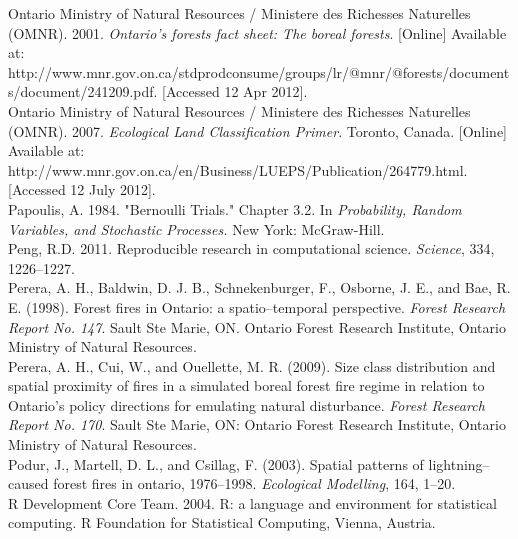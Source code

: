 \begin{spacing}{1.5}
\noindent Ontario Ministry of Natural Resources / Ministere des Richesses Naturelles (OMNR). 2001. \emph{Ontario's  forests  fact  sheet: The boreal forests}. [Online] Available at: http://www.mnr.gov.on.ca/stdprodconsume/groups/lr/@mnr/@forests/\linebreak documents/document/241209.pdf. [Accessed 12 Apr 2012].\\

\noindent Ontario Ministry of Natural Resources / Ministere des Richesses Naturelles (OMNR). 2007. \emph{Ecological Land Classification Primer}. Toronto, Canada. [Online] Available at: http://www.mnr.gov.on.ca/en/Business/LUEPS/Publication\linebreak /264779.html. [Accessed 12 July 2012].\\

\noindent Papoulis, A. 1984. "Bernoulli Trials." Chapter 3.2. In \emph{Probability, Random Variables, and Stochastic Processes.} New York: McGraw-Hill.\\

\noindent Peng, R.D. 2011. Reproducible research in computational science. \emph{Science}, 334, 1226--1227.\\

\noindent Perera, A. H., Baldwin, D. J. B., Schnekenburger, F., Osborne, J. E., and Bae, R. E. (1998). Forest fires in Ontario: a spatio--temporal perspective. \emph{Forest Research Report No. 147}. Sault Ste Marie, ON. Ontario Forest Research Institute, Ontario Ministry of Natural Resources.\\

\noindent Perera, A. H., Cui, W., and Ouellette, M. R. (2009). Size class distribution and spatial proximity of fires  in  a  simulated  boreal  forest  fire  regime  in  relation  to  Ontario's  policy  directions  for  emulating   natural disturbance. \emph{Forest Research Report No. 170}. Sault Ste Marie, ON: Ontario Forest Research Institute, Ontario Ministry of Natural Resources.\\

\noindent Podur, J., Martell, D. L., and Csillag, F. (2003). Spatial patterns of lightning--caused forest fires in ontario, 1976--1998.\emph{ Ecological Modelling}, 164, 1--20.\\

\noindent R Development Core Team. 2004. R: a language and environment for statistical computing. R Foundation for Statistical Computing, Vienna, Austria. \\


\end{spacing}
